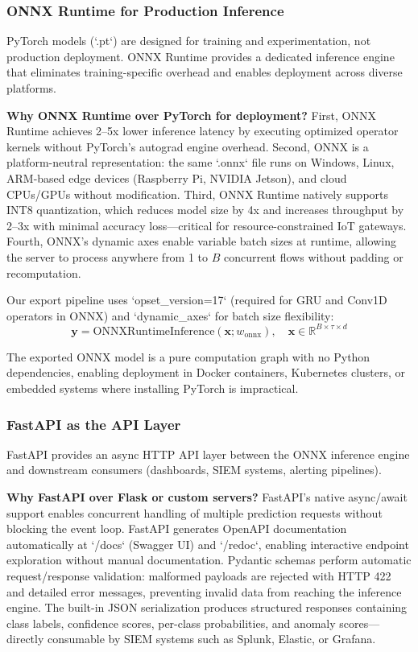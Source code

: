 \documentclass[conference]{IEEEtran}
\begin{document}
\subsubsection{ONNX Runtime for Production Inference}

PyTorch models (`.pt`) are designed for training and experimentation, not production deployment. ONNX Runtime provides a dedicated inference engine that eliminates training-specific overhead and enables deployment across diverse platforms.

\textbf{Why ONNX Runtime over PyTorch for deployment?} First, ONNX Runtime achieves 2--5x lower inference latency by executing optimized operator kernels without PyTorch's autograd engine overhead. Second, ONNX is a platform-neutral representation: the same `.onnx` file runs on Windows, Linux, ARM-based edge devices (Raspberry Pi, NVIDIA Jetson), and cloud CPUs/GPUs without modification. Third, ONNX Runtime natively supports INT8 quantization, which reduces model size by 4x and increases throughput by 2--3x with minimal accuracy loss---critical for resource-constrained IoT gateways. Fourth, ONNX's dynamic axes enable variable batch sizes at runtime, allowing the server to process anywhere from 1 to $B$ concurrent flows without padding or recomputation.

Our export pipeline uses `opset_version=17` (required for GRU and Conv1D operators in ONNX) and `dynamic_axes` for batch size flexibility:
\begin{equation}
\mathbf{y} = \mathrm{ONNXRuntimeInference}(\mathbf{x}; w_{\mathrm{onnx}}), \quad \mathbf{x} \in \mathbb{R}^{B \times \tau \times d}
\end{equation}

The exported ONNX model is a pure computation graph with no Python dependencies, enabling deployment in Docker containers, Kubernetes clusters, or embedded systems where installing PyTorch is impractical.

\subsubsection{FastAPI as the API Layer}

FastAPI provides an async HTTP API layer between the ONNX inference engine and downstream consumers (dashboards, SIEM systems, alerting pipelines).

\textbf{Why FastAPI over Flask or custom servers?} FastAPI's native async/await support enables concurrent handling of multiple prediction requests without blocking the event loop. FastAPI generates OpenAPI documentation automatically at `/docs` (Swagger UI) and `/redoc`, enabling interactive endpoint exploration without manual documentation. Pydantic schemas perform automatic request/response validation: malformed payloads are rejected with HTTP 422 and detailed error messages, preventing invalid data from reaching the inference engine. The built-in JSON serialization produces structured responses containing class labels, confidence scores, per-class probabilities, and anomaly scores---directly consumable by SIEM systems such as Splunk, Elastic, or Grafana.
\end{document}
